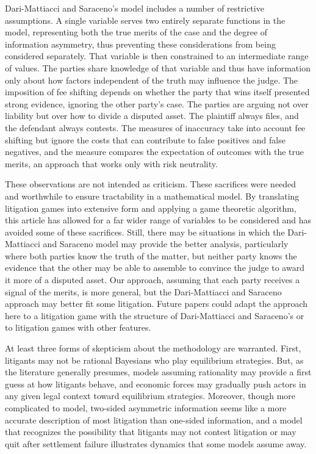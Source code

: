 \documentclass{article}
\begin{document}
Dari-Mattiacci and Saraceno's model includes a number of restrictive assumptions. A single variable serves two entirely separate functions in the model, representing both the true merits of the case and the degree of information asymmetry, thus preventing these considerations from being considered separately. That variable is then constrained to an intermediate range of values. The parties share knowledge of that variable and thus have information only about how factors independent of the truth may influence the judge. The imposition of fee shifting depends on whether the party that wins itself presented strong evidence, ignoring the other party's case.  The parties are arguing not over liability but over how to divide a disputed asset. The plaintiff always files, and the defendant always contests. The measures of inaccuracy take into account fee shifting but ignore the costs that can contribute to false positives and false negatives, and the measure compares the expectation of outcomes with the true merits, an approach that works only with risk neutrality. 

These observations are not intended as criticism. These sacrifices were needed and worthwhile to ensure tractability in a mathematical model. By translating litigation games into extensive form and applying a game theoretic algorithm, this article has allowed for a far wider range of variables to be considered and has avoided some of these sacrifices. Still, there may be situations in which the Dari-Mattiacci and Saraceno model may provide the better analysis, particularly where both parties know the truth of the matter, but neither party knows the evidence that the other may be able to assemble to convince the judge to award it more of a disputed asset. Our approach, assuming that each party receives a signal of the merits, is more general, but the Dari-Mattiacci and Saraceno approach may better fit some litigation. Future papers could adapt the approach here to a litigation game with the structure of Dari-Mattiacci and Saraceno's or to litigation games with other features.

At least three forms of skepticism about the methodology are warranted. First, litigants may not be rational Bayesians who play equilibrium strategies. But, as the literature generally presumes, models assuming rationality may provide a first guess at how litigants behave, and economic forces may gradually push actors in any given legal context toward equilibrium strategies.  Moreover, though more complicated to model, two-sided asymmetric information seems like a more accurate description of most litigation than one-sided information, and a model that recognizes the possibility that litigants may not contest litigation or may quit after settlement failure illustrates dynamics that some models assume away. 
\end{document}
